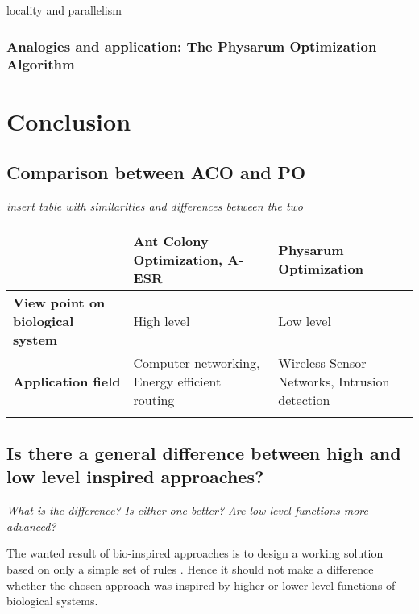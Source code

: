 \documentclass{IWORK2014}
\begin{document}
locality and parallelism
\subsubsection{Analogies and application: The Physarum Optimization Algorithm}


\section{Conclusion}

\subsection{Comparison between ACO and PO}
\textit{insert table with similarities and differences between the two}
\begin{table}[h]
\begin{tabular}{|l|l|l|}
\hline
                                         & \textbf{Ant Colony Optimization, A-ESR}       & \textbf{Physarum Optimization}              \\ \hline
\textbf{View point on biological system} & High level                                    & Low level                                   \\ \hline
\textbf{Application field}               & Computer networking, Energy efficient routing & Wireless Sensor Networks, Intrusion detection \\ \hline
                                         &                                               &                                             \\ \hline
\end{tabular}
\end{table}

\subsection{Is there a general difference between high and low level inspired approaches?}
\textit{What is the difference? Is either one better? Are low level functions more advanced?}

The wanted result of bio-inspired approaches is to design a working solution based on only a simple set of rules \cite{dressler2010bio}. Hence it should not make a difference whether the chosen approach was inspired by higher or lower level functions of biological systems.
\end{document}
